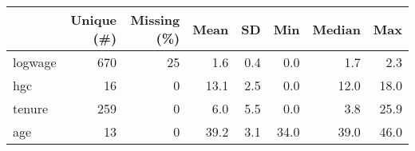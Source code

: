 \begin{table}
\centering
\begin{tabular}[t]{lrrrrrrr}
\toprule
  & Unique (\#) & Missing (\%) & Mean & SD & Min & Median & Max\\
\midrule
logwage & 670 & 25 & \num{1.6} & \num{0.4} & \num{0.0} & \num{1.7} & \num{2.3}\\
hgc & 16 & 0 & \num{13.1} & \num{2.5} & \num{0.0} & \num{12.0} & \num{18.0}\\
tenure & 259 & 0 & \num{6.0} & \num{5.5} & \num{0.0} & \num{3.8} & \num{25.9}\\
age & 13 & 0 & \num{39.2} & \num{3.1} & \num{34.0} & \num{39.0} & \num{46.0}\\
\bottomrule
\end{tabular}
\end{table}
